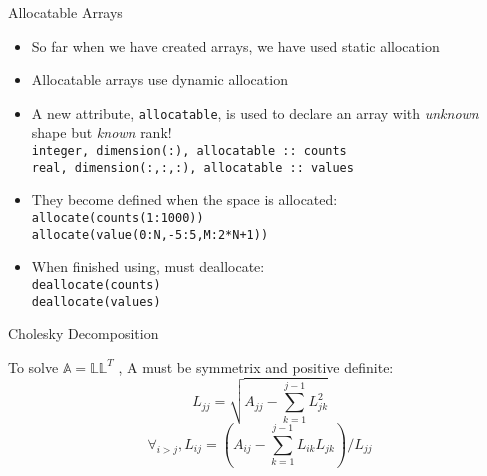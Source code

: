 \documentclass{beamer}
\begin{document}
\begin{frame}{Allocatable Arrays}

  \begin{itemize}
    \item So far when we have created arrays, we have used \alert{static allocation}
    \vfill\item Allocatable arrays use \alert{dynamic allocation}
    \vfill\item A new attribute, \texttt{allocatable}, is used to declare an array with \emph{unknown} shape but \emph{known} rank! \\
      \hspace{0.1cm} \texttt{integer, dimension(:), allocatable :: counts} \\
      \hspace{0.1cm} \texttt{real, dimension(:,:,:), allocatable :: values}
    \vfill\item They become defined when the space is allocated: \\
      \hspace{0.1cm} \texttt{allocate(counts(1:1000))} \\
      \hspace{0.1cm} \texttt{allocate(value(0:N,-5:5,M:2*N+1))}
    \vfill\item When finished using, \alert{must} deallocate: \\
      \hspace{0.1cm} \texttt{deallocate(counts)} \\
      \hspace{0.1cm} \texttt{deallocate(values)}
  \end{itemize}

\end{frame}
\begin{frame}{Cholesky Decomposition}

To solve $\mathbb{A} = \mathbb{L}\mathbb{L}^{T}$ , A must be symmetrix and positive definite: \\
\vfill
\begin{equation}
 \nonumber
  L_{jj} = \sqrt{A_{jj} - \sum_{k=1}^{j-1}{L_{jk}^{2}}}
\end{equation}
\vfill
\begin{equation}
 \nonumber
  \forall_{i>j}, L_{ij} = \left ( A_{ij} - \sum_{k=1}^{j-1} L_{ik}L_{jk} \right)/L_{jj}
\end{equation}


\end{frame}
\end{document}
